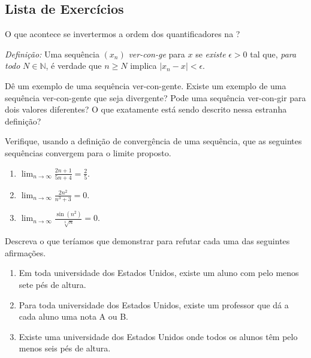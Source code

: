 \subsection{Lista de Exercícios}\label{subsec:exercicios-limite-sequencia}

\begin{exercise}\label{ex:2-2-1}
O que acontece se invertermos a ordem dos quantificadores na ?

\noindent\textit{Definição:} Uma sequência $(x_n)$ \textit{ver-con-ge} para $x$ se \textit{existe} $\epsilon > 0$ tal que, \textit{para todo} $N \in \mathbb{N}$, é verdade que $n \geq N$ implica $|x_n - x| < \epsilon$.

Dê um exemplo de uma sequência ver-con-gente. Existe um exemplo de uma sequência ver-con-gente que seja divergente? Pode uma sequência ver-con-gir para dois valores diferentes? O que exatamente está sendo descrito nessa estranha definição?
\end{exercise}

\begin{exercise}\label{ex:2-2-2}
Verifique, usando a definição de convergência de uma sequência, que as seguintes sequências convergem para o limite proposto.
\begin{enumerate}[label=\alph*)]
\item $\displaystyle\lim_{n\to\infty} \frac{2n+1}{5n+4} = \frac{2}{5}$.
\item $\displaystyle\lim_{n\to\infty} \frac{2n^2}{n^3+3} = 0$.
\item $\displaystyle\lim_{n\to\infty} \frac{\sin(n^2)}{\sqrt[3]{n}} = 0$.
\end{enumerate}
\end{exercise}

\begin{exercise}\label{ex:2-2-3}
Descreva o que teríamos que demonstrar para refutar cada uma das seguintes afirmações.
\begin{enumerate}[label=\alph*)]
\item Em toda universidade dos Estados Unidos, existe um aluno com pelo menos sete pés de altura.
\item Para toda universidade dos Estados Unidos, existe um professor que dá a cada aluno uma nota A ou B.
\item Existe uma universidade dos Estados Unidos onde todos os alunos têm pelo menos seis pés de altura.
\end{enumerate}
\end{exercise}

